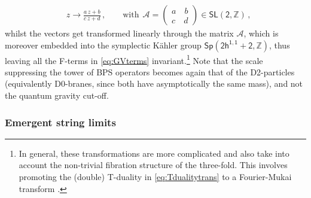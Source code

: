 %
\begin{align}\label{eq:Tdualitytrans}
	&z \rightarrow \frac{a\, z + b}{c\, z+d}\,,\qquad \text{with}\ \ \mathcal{A}= \begin{pmatrix}
		a \quad  b\\c \quad  d
	\end{pmatrix} \in \mathsf{SL(2,\mathbb{Z})}\, ,
\end{align}
%
whilst the vectors get transformed linearly through the matrix $\mathcal{A}$, which is moreover embedded into the symplectic K\"ahler group $\mathsf{Sp(2h^{1,1}+2, \mathbb{Z})}$, thus leaving all the F-terms in \eqref{eq:GVterms} invariant.\footnote{In general, these transformations are more complicated and also take into account the non-trivial fibration structure of the three-fold. This involves promoting the (double) T-duality in \eqref{eq:Tdualitytrans} to a Fourier-Mukai transform \cite{Andreas:2004uf, Cota:2019cjx}.} Note that the scale suppressing the tower of BPS operators becomes again that of the D2-particles (equivalently D0-branes, since both have asymptotically the same mass), and not the quantum gravity cut-off.

\subsubsection*{Emergent string limits}

